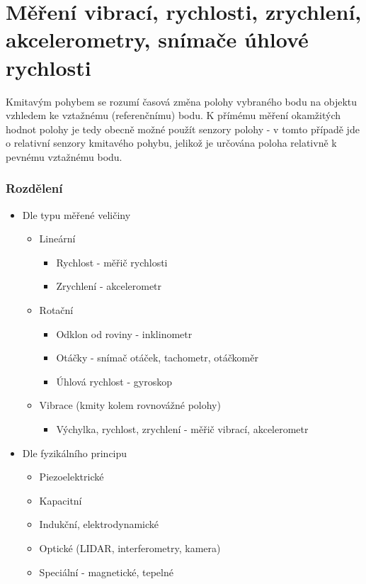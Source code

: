 \section{Měření vibrací, rychlosti, zrychlení, akcelerometry, snímače úhlové rychlosti}
Kmitavým pohybem se rozumí časová změna polohy vybraného bodu na objektu vzhledem ke vztažnému (referenčnímu) bodu. K přímému měření okamžitých hodnot polohy je tedy obecně možné použít senzory polohy - v tomto případě jde o relativní senzory kmitavého pohybu, jelikož je určována poloha relativně k pevnému vztažnému bodu.

\subsubsection*{Rozdělení}
\begin{itemize}
    \item Dle typu měřené veličiny \begin{itemize}
              \item Lineární \begin{itemize}
                        \item Rychlost - měřič rychlosti
                        \item Zrychlení - akcelerometr
                    \end{itemize}
              \item Rotační \begin{itemize}
                        \item Odklon od roviny - inklinometr
                        \item Otáčky - snímač otáček, tachometr, otáčkoměr
                        \item Úhlová rychlost - gyroskop
                    \end{itemize}
              \item Vibrace (kmity kolem rovnovážné polohy) \begin{itemize}
                        \item Výchylka, rychlost, zrychlení - měřič vibrací, akcelerometr
                    \end{itemize}
          \end{itemize}
    \item Dle fyzikálního principu \begin{itemize}
              \item Piezoelektrické
              \item Kapacitní
              \item Indukční, elektrodynamické
              \item Optické (LIDAR, interferometry, kamera)
              \item Speciální - magnetické, tepelné
          \end{itemize}
\end{itemize}

